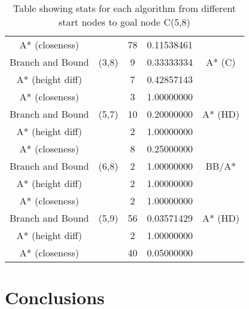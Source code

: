 \documentclass[11pt,oneside]{article}
\begin{document}
\begin{table}[!ht]
\begin{tabular}{|c|c|c|c|c|}
        A* (closeness)   &               & 78         & 0.11538461 &                          \\
        Branch and Bound & (3,8)         & 9          & 0.33333334 & A* (C)                   \\
        A* (height diff) &               & 7          & 0.42857143 &                          \\
        A* (closeness)   &               & 3          & 1.00000000 &                          \\
        Branch and Bound & (5,7)         & 10         & 0.20000000 & A* (HD)                  \\
        A* (height diff) &               & 2          & 1.00000000 &                          \\
        A* (closeness)   &               & 8          & 0.25000000 &                          \\
        Branch and Bound & (6,8)         & 2          & 1.00000000 & BB/A*                    \\
        A* (height diff) &               & 2          & 1.00000000 &                          \\
        A* (closeness)   &               & 2          & 1.00000000 &                          \\
        Branch and Bound & (5,9)         & 56         & 0.03571429 & A* (HD)                  \\
        A* (height diff) &               & 2          & 1.00000000 &                          \\
        A* (closeness)   &               & 40         & 0.05000000 &                          \\
    \end{tabular}
    \caption{Table showing stats for each algorithm from different start nodes to goal node C(5,8)}
    \label{tab:my_label}
\end{table}

\section{Conclusions}
\end{document}
